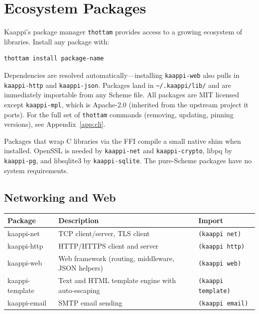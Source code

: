 \chapter{Ecosystem Packages}
\label{app:ecosystem}

Kaappi's package manager \texttt{thottam} provides access to a growing ecosystem of libraries. Install any package with:

\begin{Verbatim}[fontsize=\small]
thottam install package-name
\end{Verbatim}

Dependencies are resolved automatically---installing \texttt{kaappi-web} also pulls in \texttt{kaappi-http} and \texttt{kaappi-json}. Packages land in \texttt{\textasciitilde/.kaappi/lib/} and are immediately importable from any Scheme file. All packages are MIT licensed except \texttt{kaappi-mpl}, which is Apache-2.0 (inherited from the upstream project it ports). For the full set of \texttt{thottam} commands (removing, updating, pinning versions), see Appendix~\ref{app:cli}.

\begin{note}
Packages that wrap C libraries via the FFI compile a small native shim when installed. OpenSSL is needed by \texttt{kaappi-net} and \texttt{kaappi-crypto}, libpq by \texttt{kaappi-pg}, and libsqlite3 by \texttt{kaappi-sqlite}. The pure-Scheme packages have no system requirements.
\end{note}

\section{Networking and Web}

\begin{center}
\small
\begin{tabularx}{\textwidth}{@{}lYl@{}}
\textbf{Package} & \textbf{Description} & \textbf{Import} \\
\hline
kaappi-net & TCP client/server, TLS client & \texttt{(kaappi net)} \\
kaappi-http & HTTP/HTTPS client and server & \texttt{(kaappi http)} \\
kaappi-web & Web framework (routing, middleware, JSON helpers) & \texttt{(kaappi web)} \\
kaappi-template & Text and HTML template engine with auto-escaping & \texttt{(kaappi template)} \\
kaappi-email & SMTP email sending & \texttt{(kaappi email)} \\
\end{tabularx}
\end{center}

